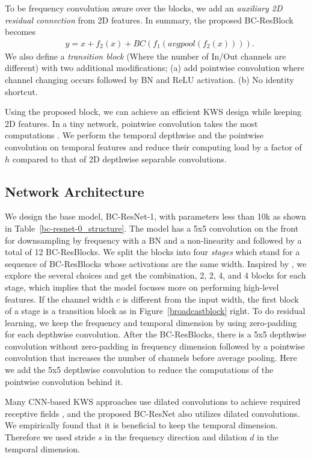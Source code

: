 \documentclass[a4paper]{article}
\begin{document}
To be frequency convolution aware over the blocks, we add an \textit{auxiliary 2D residual connection} from 2D features. In summary, the proposed BC-ResBlock becomes
\begin{align}\label{eq:broadcastsum2}
    & y = x + f_2(x) + \textit{BC}( f_1(\textit{avgpool}(f_2(x)))).
\end{align}
We also define a \textit{transition block} (Where the number of In/Out channels are different) with two additional modifications; (a) add pointwise convolution where channel changing occurs followed by BN and ReLU activation. (b) No identity shortcut.

Using the proposed block, we can achieve an efficient KWS design while keeping 2D features. In a tiny network, pointwise convolution takes the most computations \cite{shufflenet}. We perform the temporal depthwise and the pointwise convolution on temporal features and reduce their computing load by a factor of $h$ compared to that of 2D depthwise separable convolutions.

\subsection{Network Architecture}

We design the base model, BC-ResNet-1, with parameters less than 10k as shown in Table~\ref{bc-resnet-0_structure}. The model has a 5x5 convolution on the front for downsampling by frequency with a BN and a non-linearity and followed by a total of 12 BC-ResBlocks. We split the blocks into four \textit{stages} which stand for a sequence of BC-ResBlocks whose activations are the same width. Inspired by \cite{efficientnet}, we explore the several choices and get the combination, 2, 2, 4, and 4 blocks for each stage, which implies that the model focuses more on performing high-level features. If the channel width $c$ is different from the input width, the first block of a stage is a transition block as in Figure~\ref{broadcastblock} right. To do residual learning, we keep the frequency and temporal dimension by using zero-padding for each depthwise convolution. After the BC-ResBlocks, there is a 5x5 depthwise convolution without zero-padding in frequency dimension followed by a pointwise convolution that increases the number of channels before average pooling. Here we add the 5x5 depthwise convolution to reduce the computations of the pointwise convolution behind it.

Many CNN-based KWS approaches use dilated convolutions to achieve required receptive fields \cite{res15, ds-resnet, matchbox}, and the proposed BC-ResNet also utilizes dilated convolutions. We empirically found that it is beneficial to keep the temporal dimension. Therefore we used stride $s$ in the frequency direction and dilation $d$ in the temporal dimension.
\end{document}
